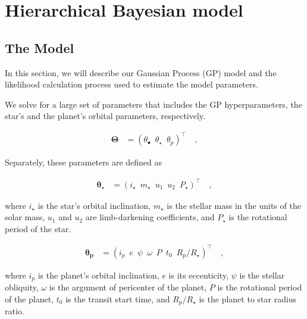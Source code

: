\documentclass[twocolumn]{aastex631}
\begin{document}
\section{Hierarchical Bayesian model}

%
\subsection{The Model}
In this section, we will describe our Gaussian Process (GP) model and the likelihood calculation process used to estimate the model parameters. 

We solve for a large set of parameters that includes the GP hyperparameters, the star's and the planet's orbital parameters, respectively. 
\begin{linenomath}\begin{align}
    \label{eq:largetheta}
    \pmb{\Theta}
     & =
    \left(
    \theta_\bullet
    \,\,\,
    \theta_\star
    \,\,\,
    \theta_p
    \right)^\top
    \quad,
\end{align}\end{linenomath}

Separately, these parameters are defined as 
\begin{linenomath}\begin{align}
    \label{eq:thetastar}
    \pmb{\theta_\star}
     & =
    \left(
    i_\star
    \,\,\,
    m_\star
    \,\,\,
    u_1
    \,\,\,
    u_2
    \,\,\,
    P_\star
    \right)^\top
    \quad,
\end{align}\end{linenomath}
where $i_\star$ is the star's orbital inclination, $m_\star$ is the stellar mass in the units of the solar mass, $u_1$ and $u_2$ are limb-darkening coefficients,
and $P_\star$ is the rotational period of the star.

\begin{linenomath}\begin{align}
    \label{eq:thetap}
    \pmb{\theta_p}
     & =
    \left(
    i_p
    \,\,\,
    e
    \,\,\,
    \psi
    \,\,\,
    \omega
    \,\,\,
    P
    \,\,\,
    t_0
    \,\,\,
    R_p/R_\star
    \right)^\top
    \quad,
\end{align}\end{linenomath}
where $i_p$ is the planet's orbital inclination, $e$ is its eccenticity, $\psi$ is the stellar obliquity, $\omega$ is the argument of pericenter of the planet,
$P$ is the rotational period of the planet, $t_0$ is the transit start time, and $R_p/R_\star$ is the planet to star radius ratio.
\end{document}

